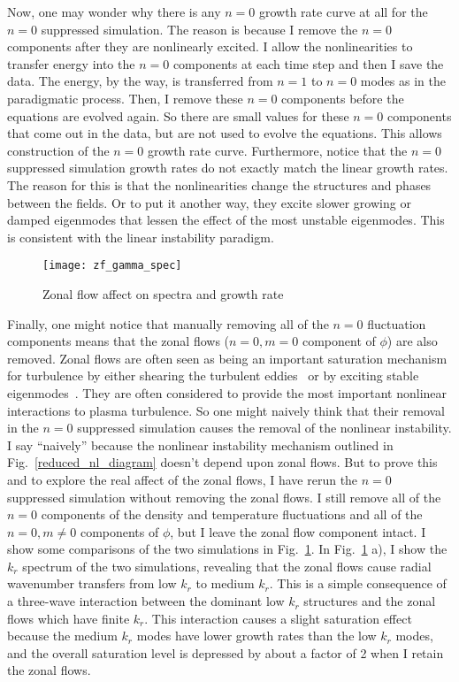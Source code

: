 Now, one may wonder why there is any $n=0$ growth rate curve at all for the $n=0$ suppressed simulation. 
The reason is because I remove the $n=0$ components after they are nonlinearly excited. I allow the nonlinearities to transfer energy 
into the $n=0$ components at each time step and then I save the data. The energy, by the way, is transferred from $n=1$ to $n=0$ modes as in the paradigmatic process. Then, I remove
these $n=0$ components before the equations are evolved again. So there are small values for these $n=0$ components that come out in the data, but are not used to evolve the equations. This allows
construction of the $n=0$ growth rate curve.
Furthermore, notice that the $n=0$ suppressed simulation growth rates do not exactly match the linear growth rates. The reason for this is that the nonlinearities change the structures and
phases between the fields. Or to put it another way, they excite slower growing or damped eigenmodes that lessen the effect of the most unstable eigenmodes. This is consistent with the linear
instability paradigm.

\begin{figure}[!ht]
\centerline{\texttt{[image: zf\_gamma\_spec]}}
\caption{Zonal flow affect on spectra and growth rate}
\label{zf_gamma_spec}
\end{figure}

Finally, one might notice that manually removing all of the $n=0$ fluctuation components means that the zonal flows ($n=0, m=0$ component of $\phi$) are also removed. 
Zonal flows are often seen as being an important saturation mechanism for turbulence by either shearing the turbulent eddies~\cite{biglari1990} or by exciting stable eigenmodes~\cite{makwana2012}.
They are often considered to provide the most important nonlinear interactions to plasma turbulence. So one might naively think that their removal in the $n=0$ suppressed simulation
causes the removal of the nonlinear instability. I say ``naively'' because the nonlinear instability mechanism outlined in Fig.~\ref{reduced_nl_diagram} doesn't depend upon zonal flows.
But to prove this and to explore the real affect of the zonal flows, I have rerun the $n=0$ suppressed simulation without removing the zonal flows. I still remove all of the $n=0$
components of the density and temperature fluctuations and all of the $n=0, m \ne 0$ components of $\phi$, but I leave the zonal flow component intact. I show some comparisons of the two
simulations in Fig.~\ref{zf_gamma_spec}. In Fig.~\ref{zf_gamma_spec} a), I show the $k_r$ spectrum of the two simulations, revealing that the zonal flows cause radial wavenumber transfers
from low $k_r$ to medium $k_r$. This is a simple consequence of a three-wave interaction between the dominant low $k_r$ structures and the zonal flows which have finite $k_r$. This interaction
causes a slight saturation effect because the medium $k_r$ modes have lower growth rates than the low $k_r$ modes, and the overall saturation level is depressed by about a factor of 2
when I retain the zonal flows.

